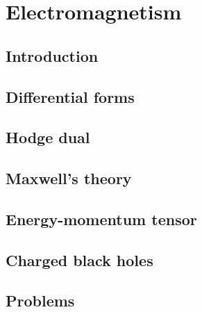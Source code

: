 \chapter{Electromagnetism}

\section{Introduction}

\section{Differential forms}

\section{Hodge dual}

\section{Maxwell's theory}

\section{Energy-momentum tensor}

\section{Charged black holes}

\section{Problems}

